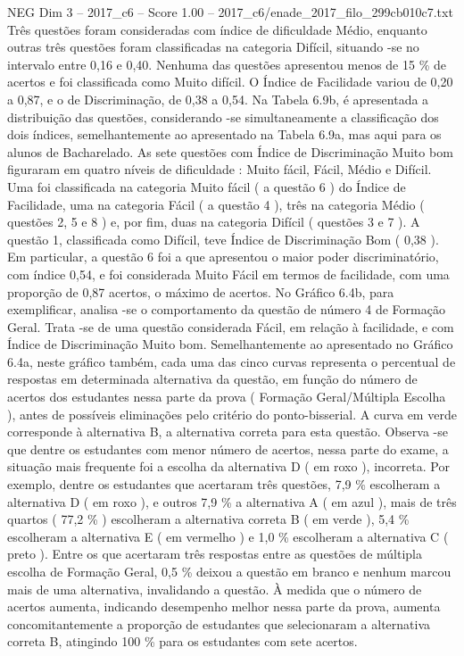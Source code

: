 \begin{textsample}{NEG Dim 3 – 2017\_c6 – Score 1.00 – 2017\_c6/enade\_2017\_filo\_299cb010c7.txt}
Três questões foram consideradas com índice de dificuldade Médio, enquanto outras três questões foram classificadas na categoria Difícil, situando -se no intervalo entre 0,16 e 0,40.
Nenhuma das questões apresentou menos de 15 \% de acertos e foi classificada como Muito difícil.
O Índice de Facilidade variou de 0,20 a 0,87, e o de Discriminação, de 0,38 a 0,54.
Na Tabela 6.9b, é apresentada a distribuição das questões, considerando -se simultaneamente a classificação dos dois índices, semelhantemente ao apresentado na Tabela 6.9a, mas aqui para os alunos de Bacharelado.
As sete questões com Índice de Discriminação Muito bom figuraram em quatro níveis de dificuldade : Muito fácil, Fácil, Médio e Difícil.
Uma foi classificada na categoria Muito fácil ( a questão 6 ) do Índice de Facilidade, uma na categoria Fácil ( a questão 4 ), três na categoria Médio ( questões 2, 5 e 8 ) e, por fim, duas na categoria Difícil ( questões 3 e 7 ).
A questão 1, classificada como Difícil, teve Índice de Discriminação Bom ( 0,38 ).
Em particular, a questão 6 foi a que apresentou o maior poder discriminatório, com índice 0,54, e foi considerada Muito Fácil em termos de facilidade, com uma proporção de 0,87 acertos, o máximo de acertos.
No Gráfico 6.4b, para exemplificar, analisa -se o comportamento da questão de número 4 de Formação Geral.
Trata -se de uma questão considerada Fácil, em relação à facilidade, e com Índice de Discriminação Muito bom.
Semelhantemente ao apresentado no Gráfico 6.4a, neste gráfico também, cada uma das cinco curvas representa o percentual de respostas em determinada alternativa da questão, em função do número de acertos dos estudantes nessa parte da prova ( Formação Geral/Múltipla Escolha ), antes de possíveis eliminações pelo critério do ponto-bisserial.
A curva em verde corresponde à alternativa B, a alternativa correta para esta questão.
Observa -se que dentre os estudantes com menor número de acertos, nessa parte do exame, a situação mais frequente foi a escolha da alternativa D ( em roxo ), incorreta.
Por exemplo, dentre os estudantes que acertaram três questões, 7,9 \% escolheram a alternativa D ( em roxo ), e outros 7,9 \% a alternativa A ( em azul ), mais de três quartos ( 77,2 \% ) escolheram a alternativa correta B ( em verde ), 5,4 \% escolheram a alternativa E ( em vermelho ) e 1,0 \% escolheram a alternativa C ( preto ).
Entre os que acertaram três respostas entre as questões de múltipla escolha de Formação Geral, 0,5 \% deixou a questão em branco e nenhum marcou mais de uma alternativa, invalidando a questão.
À medida que o número de acertos aumenta, indicando desempenho melhor nessa parte da prova, aumenta concomitantemente a proporção de estudantes que selecionaram a alternativa correta B, atingindo 100 \% para os estudantes com sete acertos.

\end{textsample}
